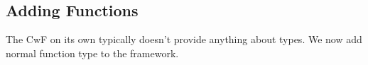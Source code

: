 \begin{itemize}
\begin{code}
\<%
\\
%
\>[4]%
\>[9]\AgdaSymbol{:}\AgdaSpace{}%
\AgdaSpace{}%
\AgdaSpace{}%
\AgdaOperator{\AgdaInductiveConstructor{,}}\AgdaSpace{}%
\AgdaSpace{}%
\AgdaSpace{}%
\AgdaSpace{}%
\<%
\\
%
\>[4]%
\>[9]\AgdaSymbol{:}\AgdaSpace{}%
\AgdaSymbol{(}\AgdaSpace{}%
\AgdaOperator{\AgdaInductiveConstructor{,}}\AgdaSpace{}%
\AgdaSymbol{)}\AgdaSpace{}%
\AgdaSpace{}%
\AgdaSpace{}%
\AgdaSpace{}%
\AgdaSpace{}%
\AgdaSpace{}%
\AgdaSpace{}%
\AgdaOperator{\AgdaInductiveConstructor{,}}\AgdaSpace{}%
\AgdaSpace{}%
\AgdaOperator{\AgdaInductiveConstructor{[}}\AgdaSpace{}%
\AgdaSpace{}%
\AgdaOperator{\AgdaInductiveConstructor{]}}\<%
\end{code}
\end{itemize}

\subsection{Adding Functions}

The CwF on its own typically doesn't provide anything about types. We now add normal function type to the framework.

